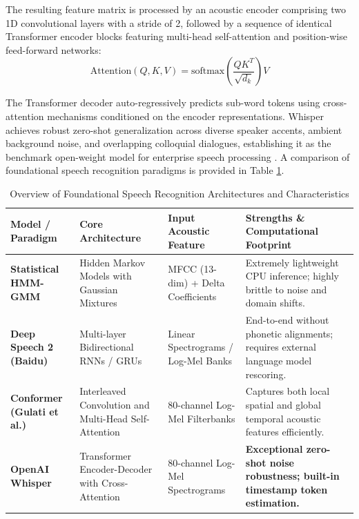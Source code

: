\documentclass[12pt,oneside,letterpaper]{report}
\numberwithin{equation}{chapter} %
\begin{document}
The resulting feature matrix is processed by an acoustic encoder comprising two 1D convolutional layers with a stride of 2, followed by a sequence of identical Transformer encoder blocks featuring multi-head self-attention and position-wise feed-forward networks:
\begin{equation}
\text{Attention}(Q, K, V) = \text{softmax}\left(\frac{QK^T}{\sqrt{d_k}}\right)V
\label{eq:self_attention}
\end{equation}

The Transformer decoder auto-regressively predicts sub-word tokens using cross-attention mechanisms conditioned on the encoder representations. Whisper achieves robust zero-shot generalization across diverse speaker accents, ambient background noise, and overlapping colloquial dialogues, establishing it as the benchmark open-weight model for enterprise speech processing \cite{watanabe2018espnet}. A comparison of foundational speech recognition paradigms is provided in Table \ref{tab:asr_comparison}.

\begin{table}[H]
\centering
\caption{Overview of Foundational Speech Recognition Architectures and Characteristics}
\label{tab:asr_comparison}
\footnotesize
\begin{tabularx}{\textwidth}{p{3.2cm}p{3.5cm}p{3.0cm}X}
\toprule
\textbf{Model / Paradigm} & \textbf{Core Architecture} & \textbf{Input Acoustic Feature} & \textbf{Strengths \& Computational Footprint} \\
\midrule
\textbf{Statistical HMM-GMM} & Hidden Markov Models with Gaussian Mixtures & MFCC (13-dim) + Delta Coefficients & Extremely lightweight CPU inference; highly brittle to noise and domain shifts. \\
\addlinespace
\textbf{Deep Speech 2 (Baidu)} & Multi-layer Bidirectional RNNs / GRUs & Linear Spectrograms / Log-Mel Banks & End-to-end without phonetic alignments; requires external language model rescoring. \\
\addlinespace
\textbf{Conformer (Gulati et al.)} & Interleaved Convolution and Multi-Head Self-Attention & 80-channel Log-Mel Filterbanks & Captures both local spatial and global temporal acoustic features efficiently. \\
\addlinespace
\textbf{OpenAI Whisper} & Transformer Encoder-Decoder with Cross-Attention & 80-channel Log-Mel Spectrograms & \textbf{Exceptional zero-shot noise robustness; built-in timestamp token estimation.} \\
\bottomrule
\end{tabularx}
\end{table}
\end{document}
